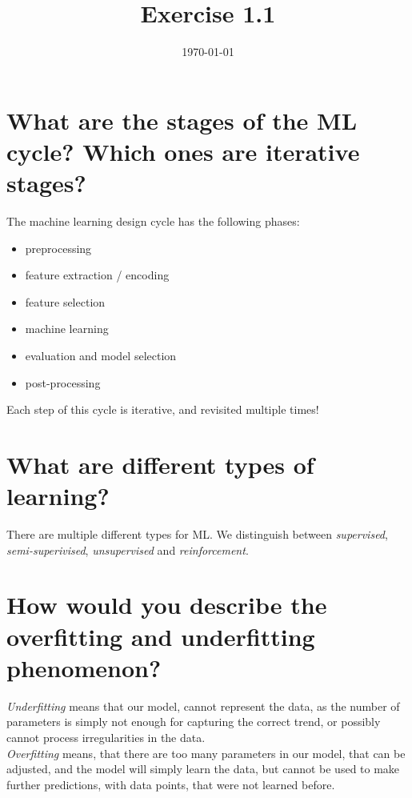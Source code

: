\documentclass{article}
\title{Exercise 1.1}
\date{\today}
\begin{document}
\maketitle
\section{What are the stages of the ML cycle? Which ones are iterative stages?}
The machine learning design cycle has the following phases:
\begin{itemize}
    \item preprocessing
    \item feature extraction / encoding
    \item feature selection
    \item machine learning
    \item evaluation and model selection
    \item post-processing
\end{itemize}
Each step of this cycle is iterative, and revisited multiple times!
\section{What are different types of learning?}
There are multiple different types for ML. We distinguish between \textit{supervised}, \textit{semi-superivised}, \textit{unsupervised} and \textit{reinforcement}.
\section{How would you describe the overfitting and underfitting phenomenon?}

\textit{Underfitting} means that our model, cannot represent the data, as the number of parameters is simply not enough for capturing the correct trend, or possibly cannot process irregularities in the data.\\

\textit{Overfitting} means, that there are too many parameters in our model, that can be adjusted, and the model will simply learn the data, but cannot be used to make further predictions, with data points, that were not learned before.
\end{document}
